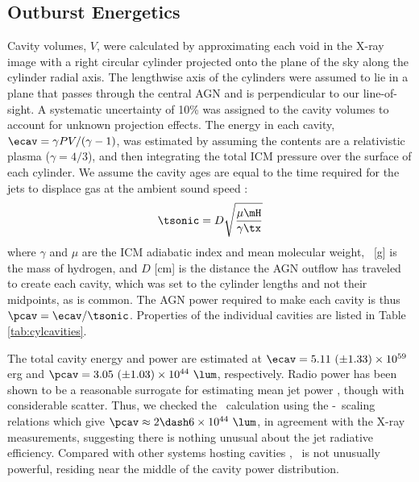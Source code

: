 \documentclass[useAMS,usenatbib]{mn2e}
\begin{document}
\subsection{Outburst Energetics}

Cavity volumes, $V$, were calculated by approximating each void in the
X-ray image with a right circular cylinder projected onto the plane of
the sky along the cylinder radial axis. The lengthwise axis of the
cylinders were assumed to lie in a plane that passes through the
central AGN and is perpendicular to our line-of-sight. A systematic
uncertainty of 10\% was assigned to the cavity volumes to account for
unknown projection effects. The energy in each cavity, $\ecav = \gamma
PV/(\gamma-1)$, was estimated by assuming the contents are a
relativistic plasma ($\gamma = 4/3$), and then integrating the total
ICM pressure over the surface of each cylinder. We assume the cavity
ages are equal to the time required for the jets to displace gas at
the ambient sound speed \citep{birzan04}:
\begin{equation}
  \tsonic = D\sqrt\frac{\mu \mH}{\gamma \tx}
\end{equation}
where $\gamma$ and $\mu$ are the ICM adiabatic index and mean
molecular weight, \mH\ [g] is the mass of hydrogen, and $D$ [cm] is
the distance the AGN outflow has traveled to create each cavity, which
was set to the cylinder lengths and not their midpoints, as is
common. The AGN power required to make each cavity is thus $\pcav =
\ecav/\tsonic$. Properties of the individual cavities are listed in
Table \ref{tab:cylcavities}.

The total cavity energy and power are estimated at $\ecav = 5.11 ~(\pm
1.33) \times 10^{59}$ erg and $\pcav = 3.05 ~(\pm 1.03) \times 10^{44}
~\lum$, respectively. Radio power has been shown to be a reasonable
surrogate for estimating mean jet power \citep{birzan08}, though with
considerable scatter. Thus, we checked the \pcav\ calculation using
the \citet{pjet} \pcav-\lrad\ scaling relations which give $\pcav
\approx 2 \dash 6 \times 10^{44} ~\lum$, in agreement with the X-ray
measurements, suggesting there is nothing unusual about the jet
radiative efficiency. Compared with other systems hosting cavities
\citep[\eg][]{birzan04, dunn08}, \irs\ is not unusually powerful,
residing near the middle of the cavity power distribution.
\end{document}
